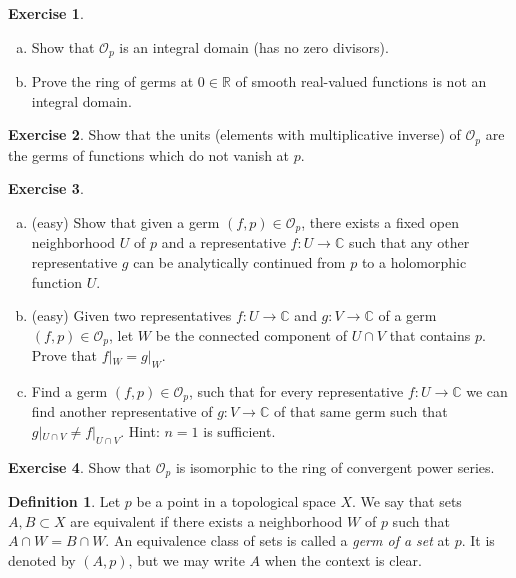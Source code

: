 \documentclass[12pt,openany]{book}
\newcommand{\C}{{\mathbb{C}}}
\newcommand{\R}{{\mathbb{R}}}
\newcommand{\sO}{{\mathscr{O}}}
\newcommand{\myindex}[1]{#1\index{#1}}
\theoremstyle{plain}
\theoremstyle{remark}
\theoremstyle{definition}
\newtheorem{defn}[thm]{Definition}
\newenvironment{exbox}{%
    \def\FrameCommand{\vrule width 1pt \relax\hspace{10pt}}%
    \MakeFramed{\advance\hsize-\width\FrameRestore}%
}{%
    \endMakeFramed
}
\newenvironment{exparts}{%
    \leavevmode\begin{enumerate}[a),noitemsep,topsep=0pt,parsep=0pt,partopsep=0pt]
}{%
    \end{enumerate}
}
\theoremstyle{exercise}
\newtheorem{exercise}{Exercise}[section]
\theoremstyle{example}
\begin{document}
\begin{exbox}
\begin{exercise}
\begin{exparts}
\item
Show that $\sO_p$ is an \myindex{integral domain} (has no zero divisors).
\item
Prove the ring of germs at $0 \in \R$ of smooth real-valued functions
is not an integral domain.
\end{exparts}
\end{exercise}

\begin{exercise}
Show that the units (elements with multiplicative inverse)
of $\sO_p$ are the germs of functions which do not vanish at
$p$.
\end{exercise}

\begin{exercise}
\begin{exparts}
\item (easy)
Show that given a germ $(f,p) \in \sO_p$,
there exists a fixed open neighborhood $U$
of $p$ and a representative $f \colon U \to \C$ such that any other
representative $g$ can be analytically continued from $p$ to a holomorphic
function $U$.
\item
(easy) Given two representatives $f \colon U \to \C$
and $g \colon V \to \C$ of a germ $(f,p) \in \sO_p$,
let $W$ be the connected component of $U \cap V$
that contains $p$.  Prove that $f|_W = g|_W$.
\item
Find a germ $(f,p) \in \sO_p$, such that for
every representative $f \colon U \to \C$ we can
find another representative of $g \colon V \to \C$
of that same germ such that $g|_{U \cap V} \not= f|_{U \cap V}$.
Hint: $n=1$ is sufficient.
\end{exparts}
\end{exercise}

\begin{exercise}
Show that $\sO_p$ is isomorphic to the ring of convergent power series.
\end{exercise}
\end{exbox}


\begin{defn}
Let $p$ be a point in a topological space $X$.
We say that sets $A, B \subset X$ are equivalent
if there exists a neighborhood $W$ of $p$
such that $A \cap W = B \cap W$.
An equivalence class of sets
is called a \emph{\myindex{germ of a set}} at $p$.
%
It is denoted by $(A,p)$, but we may write $A$ when
the context is clear.
\end{defn}
\end{document}
